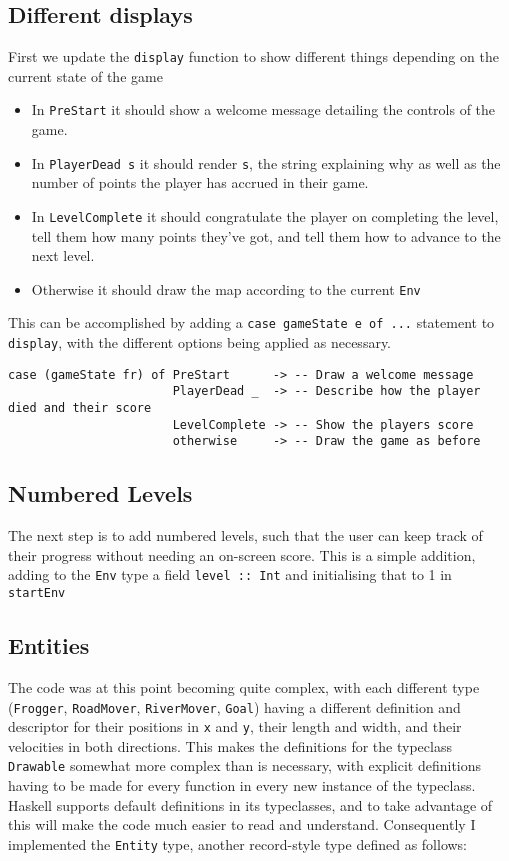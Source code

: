 \documentclass[12pt, a4paper]{report}
\begin{document}
\subsection{Different displays}

First we update the \verb|display| function to show different things depending on the current state of the game
\begin{itemize}
  \item In \verb|PreStart| it should show a welcome message detailing the controls of the game.
  \item In \verb|PlayerDead s| it should render \verb|s|, the string explaining why as well as the number of points the player has accrued in their game.
  \item In \verb|LevelComplete| it should congratulate the player on completing the level, tell them how many points they've got, and tell them how to advance to the next level.
  \item Otherwise it should draw the map according to the current \verb|Env|
\end{itemize}

This can be accomplished by adding a \verb|case gameState e of ...| statement to \verb|display|, with the different options being applied as necessary.

\begin{lstlisting}
case (gameState fr) of PreStart      -> -- Draw a welcome message
                       PlayerDead _  -> -- Describe how the player died and their score
                       LevelComplete -> -- Show the players score
                       otherwise     -> -- Draw the game as before
\end{lstlisting}

\subsection{Numbered Levels}

The next step is to add numbered levels, such that the user can keep track of their progress without needing an on-screen score.
This is a simple addition, adding to the \verb|Env| type a field \verb|level :: Int| and initialising that to 1 in \verb|startEnv|

\subsection{Entities}

The code was at this point becoming quite complex, with each different type (\verb|Frogger|, \verb|RoadMover|, \verb|RiverMover|, \verb|Goal|) having a different definition and descriptor for their positions in \verb|x| and \verb|y|, their length and width, and their velocities in both directions.
This makes the definitions for the typeclass \verb|Drawable| somewhat more complex than is necessary, with explicit definitions having to be made for every function in every new instance of the typeclass.
Haskell supports default definitions in its typeclasses, and to take advantage of this will make the code much easier to read and understand.
Consequently I implemented the \verb|Entity| type, another record-style type defined as follows:
\end{document}
